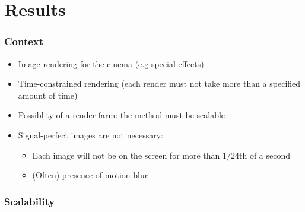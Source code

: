 \documentclass{beamer}
\begin{document}
\section{Results}
\begin{frame}
    \frametitle{Context}
    \begin{itemize}
        \item Image rendering for the cinema (e.g special effects)
        \item Time-constrained rendering (each render must not take more than a specified amount of time)
        \item Possiblity of a render farm: the method must be scalable
            \vfill
        \item Signal-perfect images are not necessary:
            \begin{itemize}
                \item Each image will not be on the screen for more than $1/24$th of a second
                \item (Often) presence of motion blur
            \end{itemize}
    \end{itemize}
\end{frame}

\begin{frame}
    \frametitle{Scalability}
    \begin{figure}
        \centering
    \end{figure}
\end{frame}
\end{document}
